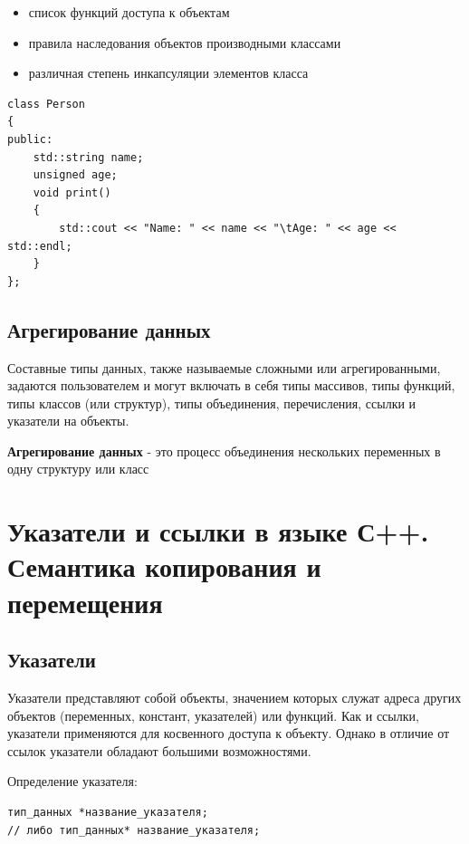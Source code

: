 \begin{itemize}
    \item список функций доступа к объектам
    \item правила наследования объектов производными классами
    \item различная степень инкапсуляции элементов класса
\end{itemize}

\begin{verbatim}
class Person 
{
public:
    std::string name;
    unsigned age;
    void print() 
    {
        std::cout << "Name: " << name << "\tAge: " << age << std::endl;
    }
};
\end{verbatim}

\subsection{Агрегирование данных}

Составные типы данных, также называемые сложными или агрегированными, задаются пользователем и могут включать в себя типы массивов, типы функций, типы классов (или структур), типы объединения, перечисления, ссылки и указатели на объекты.

\textbf{Агрегирование данных} - это процесс объединения нескольких переменных в одну структуру или класс

\section{Указатели и ссылки в языке С++. Семантика копирования и перемещения} \label{pointers_and_refs}

\subsection{Указатели}

Указатели представляют собой объекты, значением которых служат адреса других объектов (переменных, констант, указателей) или функций. Как и ссылки, указатели применяются для косвенного доступа к объекту. Однако в отличие от ссылок указатели обладают большими возможностями.

\vspace{\baselineskip}

\noindent Определение указателя:
\begin{verbatim}
тип_данных *название_указателя;
// либо тип_данных* название_указателя;
\end{verbatim}

